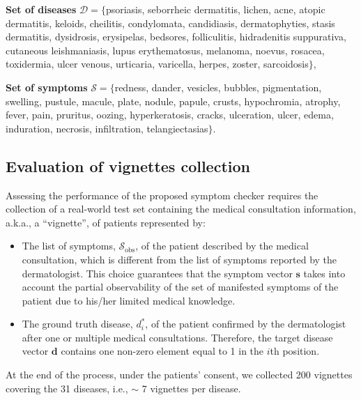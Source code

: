 \documentclass[pmlr,twocolumn,10pt]{jmlr} %
\begin{document}
\noindent\textbf{Set of diseases} $\mathcal{D} = \{$psoriasis, seborrheic dermatitis, lichen, acne, atopic dermatitis, keloids, cheilitis, condylomata, candidiasis, dermatophyties, stasis dermatitis, dysidrosis, erysipelas, bedsores, folliculitis, hidradenitis suppurativa, cutaneous leishmaniasis, lupus erythematosus, melanoma, noevus, rosacea, toxidermia, ulcer venous, urticaria, varicella, herpes, zoster, sarcoidosis$\}$,

\noindent \textbf{Set of symptoms} $\mathcal{S} = \{$redness, dander, vesicles, bubbles, pigmentation, swelling, pustule, macule, plate, nodule, papule, crusts, hypochromia, atrophy, fever, pain, pruritus, oozing, hyperkeratosis, cracks, ulceration, ulcer, edema, induration, necrosis, infiltration, telangiectasias$\}$.%



\vspace{-0.3cm}
\subsection{Evaluation of vignettes collection}
Assessing the performance of the proposed symptom checker requires the collection of a real-world test set containing the medical consultation information, a.k.a., a ``vignette'', of patients represented by:\vspace{-0.25cm}
\begin{itemize}[leftmargin=*]
    \item The list of symptoms, $\mathcal{S}_{\textrm{obs}}$, of the patient described by the medical consultation, which is different from the list of symptoms reported by the dermatologist. This choice guarantees that the symptom vector $\mathbf{s}$ takes into account the partial observability of the set of manifested symptoms of the patient due to his/her limited medical knowledge.\vspace{-0.25cm}
    \item The ground truth disease, $d_i^*$, of the patient confirmed by the dermatologist after one or multiple medical consultations. Therefore, the target disease vector $\mathbf{d}$ contains one non-zero element equal to 1 in the $i$th position.
\end{itemize}
At the end of the process, under the patients' consent, we collected 200 vignettes covering the 31 diseases, i.e., $\sim$ 7 vignettes per disease.\vspace{-0.3cm}
\end{document}
